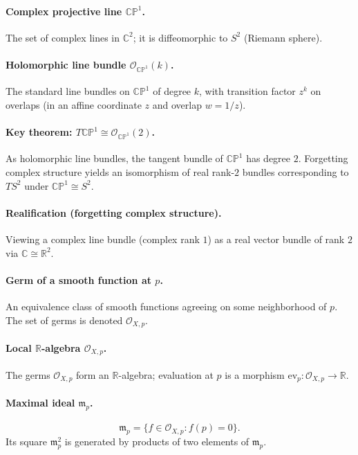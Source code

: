 \documentclass[12pt,a4paper]{article}
\theoremstyle{plain}
\theoremstyle{definition}      %
\begin{document}
\paragraph{\textbf{Complex projective line $\mathbb{CP}^1$.}}
The set of complex lines in $\mathbb{C}^2$; it is diffeomorphic to $S^2$ (Riemann sphere).

\paragraph{\textbf{Holomorphic line bundle $\mathcal{O}_{\mathbb{CP}^1}(k)$.}}
The standard line bundles on $\mathbb{CP}^1$ of degree $k$, with transition factor $z^{k}$ on overlaps
(in an affine coordinate $z$ and overlap $w=1/z$).

\paragraph{\textbf{Key theorem: $T\mathbb{CP}^1 \cong \mathcal{O}_{\mathbb{CP}^1}(2)$.}}
As holomorphic line bundles, the tangent bundle of $\mathbb{CP}^1$ has degree $2$.
Forgetting complex structure yields an isomorphism of real rank-$2$ bundles corresponding to $TS^2$ under
$\mathbb{CP}^1\cong S^2$.

\paragraph{\textbf{Realification (forgetting complex structure).}}
Viewing a complex line bundle (complex rank $1$) as a real vector bundle of rank $2$ via $\mathbb{C}\cong\mathbb{R}^2$.

\paragraph{\textbf{Germ of a smooth function at $p$.}}
An equivalence class of smooth functions agreeing on some neighborhood of $p$.
The set of germs is denoted $\mathcal{O}_{X,p}$.

\paragraph{\textbf{Local $\mathbb{R}$-algebra $\mathcal{O}_{X,p}$.}}
The germs $\mathcal{O}_{X,p}$ form an $\mathbb{R}$-algebra; evaluation at $p$ is a morphism
$\mathrm{ev}_p:\mathcal{O}_{X,p}\to\mathbb{R}$.

\paragraph{\textbf{Maximal ideal $\mathfrak{m}_p$.}}
\[
\mathfrak{m}_p = \{f\in \mathcal{O}_{X,p}: f(p)=0\}.
\]
Its square $\mathfrak{m}_p^2$ is generated by products of two elements of $\mathfrak{m}_p$.
\end{document}
